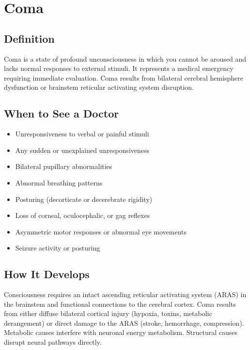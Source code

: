 \chapter{Coma}

\section*{Definition}
Coma is a state of profound unconsciousness in which you cannot be aroused and lacks normal responses to external stimuli. It represents a medical emergency requiring immediate evaluation. Coma results from bilateral cerebral hemisphere dysfunction or brainstem reticular activating system disruption.

\section*{When to See a Doctor}
\begin{itemize}
\item Unresponsiveness to verbal or painful stimuli
 \item Any sudden or unexplained unresponsiveness
\item Bilateral pupillary abnormalities
\item Abnormal breathing patterns
\item Posturing (decorticate or decerebrate rigidity)
\item Loss of corneal, oculocephalic, or gag reflexes
\item Asymmetric motor responses or abnormal eye movements
\item Seizure activity or posturing
\end{itemize}

\section*{How It Develops}
Consciousness requires an intact ascending reticular activating system (ARAS) in the brainstem and functional connections to the cerebral cortex. Coma results from either diffuse bilateral cortical injury (hypoxia, toxins, metabolic derangement) or direct damage to the ARAS (stroke, hemorrhage, compression). Metabolic causes interfere with neuronal energy metabolism. Structural causes disrupt neural pathways directly.

